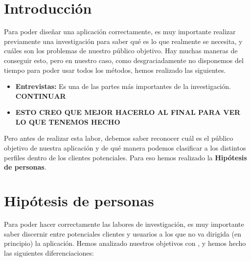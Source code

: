 
\section{Introducción}

Para poder diseñar una aplicación correctamente, es muy importante realizar previamente una investigación para saber qué
es lo que realmente se necesita, y cuáles son los problemas de nuestro público objetivo. Hay muchas maneras de conseguir esto, pero en nuestro
caso, como desgraciadamente no disponemos del tiempo para poder usar todos los métodos, hemos realizado las siguientes.

\begin{itemize}
    \item \textbf{Entrevistas:} Es una de las partes más importantes de la investigación. \textbf{CONTINUAR}
    \item \textbf{ESTO CREO QUE MEJOR HACERLO AL FINAL PARA VER LO QUE TENEMOS HECHO}
\end{itemize}



Pero antes de realizar esta labor, debemos saber reconocer cuál es el público objetivo de nuestra aplicación y
de qué manera podemos clasificar a los distintos perfiles dentro de los clientes potenciales. Para eso hemos realizado la
\textbf{Hipótesis de personas}.

\section{Hipótesis de personas}

Para poder hacer correctamente las labores de investigación, es muy importante saber discernir entre potenciales clientes y usuarios
a los que no va dirigida (en principio) la aplicación. Hemos analizado nuestros objetivos con \textit{\app}, y hemos hecho las siguientes
diferenciaciones:

